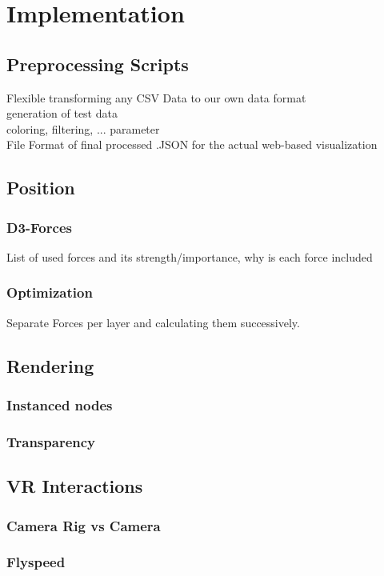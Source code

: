 \chapter{Implementation}


\section{Preprocessing Scripts}

Flexible transforming any CSV Data to our own data format \\
generation of test data \\
coloring, filtering, ... parameter \\
File Format of final processed .JSON for the actual web-based visualization \\

\section{Position}
\subsection{D3-Forces}
List of used forces and its strength/importance, why is each force included
\subsection{Optimization}
Separate Forces per layer and calculating them successively.

\section{Rendering}
\subsection{Instanced nodes}
\subsection{Transparency}

\section{VR Interactions}
\subsection{Camera Rig vs Camera}
\subsection{Flyspeed}
